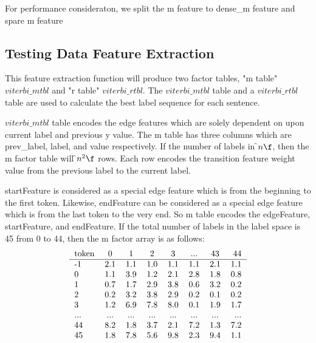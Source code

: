 For performance consideraton, we split the m feature to dense\_m feature and spare m feature\\

\subsection{Testing Data Feature Extraction}
  This feature extraction function will produce two factor tables, "m table"
  $viterbi\_mtbl$ and "r table" $viterbi\_rtbl$. The $viterbi\_mtbl$
  table and a $viterbi\_rtbl$ table are used to calculate the best label
  sequence for each sentence.
 
  $viterbi\_mtbl$ table
  encodes the edge features which are solely dependent on upon current label and
  previous y value. The m table has three columns which are prev\_label, label,
  and value respectively.
  If the number of labels in \f$ n \f$, then the m factor table will \f$ n^2 \f$
  rows. Each row encodes the transition feature weight value from the previous label
  to the current label.
 
  startFeature is considered as a special edge feature which is from the
  beginning to the first token. Likewise, endFeature can be considered
  as a special edge feature which is from the last token to the very end.
  So m table encodes the edgeFeature, startFeature, and endFeature.
  If the total number of labels in the label space is 45 from 0 to 44,
  then the m factor array is as follows:
  \[\begin{tabular}{l*{6}{c}r}
   token             & 0   & 1   & 2   & 3   & ... & 43 &  44 \\
   \hline
  -1                 & 2.1 & 1.1 & 1.0 & 1.1 & 1.1 & 2.1 & 1.1  \\
   0                 & 1.1 & 3.9 & 1.2 & 2.1 & 2.8 & 1.8 & 0.8  \\
   1                 & 0.7 & 1.7 & 2.9 & 3.8 & 0.6 & 3.2 & 0.2  \\
   2                 & 0.2 & 3.2 & 3.8 & 2.9 & 0.2 & 0.1 & 0.2  \\
   3                 & 1.2 & 6.9 & 7.8 & 8.0 & 0.1 & 1.9 & 1.7  \\
   ...               & ... & ... & ... & ... & ... & ... & ...  \\
   44                & 8.2 & 1.8 & 3.7 & 2.1 & 7.2 & 1.3 & 7.2  \\
   45                & 1.8 & 7.8 & 5.6 & 9.8 & 2.3 & 9.4 & 1.1  \\
  \end{tabular}\]
 
